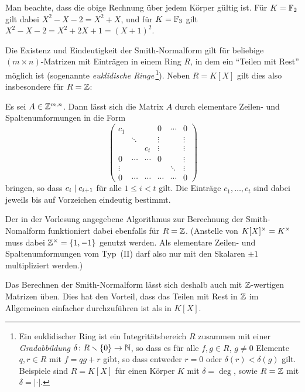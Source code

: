 Man beachte, dass die obige Rechnung über jedem Körper gültig ist.
Für $K = \mathbb{F}_2$ gilt dabei $X^2 - X - 2 = X^2 + X$, und für $K = \mathbb{F}_3$ gilt $X^2 - X - 2 = X^2 + 2X + 1 = (X+1)^2$.

\begin{remark}
  Die Existenz und Eindeutigkeit der Smith-Normalform gilt für beliebige $(m \times n)$-Matrizen mit Einträgen in einem Ring $R$, in dem ein \enquote{Teilen mit Rest} möglich ist (sogenannte \emph{euklidische Ringe}\,\footnote{
  Ein euklidischer Ring ist ein Integritätsbereich $R$ zusammen mit einer \emph{Gradabbildung} $\delta \colon R \smallsetminus \{0\} \to \mathbb{N}$, so dass es für alle $f, g \in R$, $g \neq 0$ Elemente $q , r \in R$ mit $f = qg + r$ gibt, so dass entweder $r = 0$ oder $\delta(r) < \delta(g)$ gilt.
  Beispiele sind $R = K[X]$ für einen Körper $K$ mit $\delta = \deg$, sowie $R = \mathbb{Z}$ mit $\delta = |\cdot|$.}).
  Neben $R = K[X]$ gilt dies also insbesondere für $R = \mathbb{Z}$:
  
  \begin{theorem}
    Es sei $A \in \mathbb{Z}^{m, n}$.
    Dann lässt sich die Matrix $A$ durch elementare Zeilen- und Spaltenumformungen in die Form
    \[
      \begin{pmatrix}
        c_1     &         &         & 0       & \cdots  & 0       \\
                & \ddots  &         & \vdots  &         & \vdots  \\
                &         & c_t     & \vdots  &         & \vdots  \\
        0       & \cdots  & \cdots  & 0       &         & \vdots  \\
        \vdots  &         &         &         & \ddots  & \vdots  \\
        0       & \cdots  & \cdots  & \cdots  & \cdots  & 0
      \end{pmatrix}
    \]
    bringen, so dass $c_i \mathrel{|} c_{i+1}$ für alle $1 \leq i < t$ gilt.
    Die Einträge $c_1, \dotsc, c_t$ sind dabei jeweils bis auf Vorzeichen eindeutig bestimmt.
  \end{theorem}
  
  Der in der Vorlesung angegebene Algorithmus zur Berechnung der Smith-Nomalform funktioniert dabei ebenfalls für $R = \mathbb{Z}$.
  (Anstelle von $K[X]^\times = K^\times$ muss dabei $\mathbb{Z}^\times = \{1, -1\}$ genutzt werden.
  Als elementare Zeilen- und Spaltenumformungen vom Typ~(II) darf also nur mit den Skalaren $\pm 1$ multipliziert werden.)
  
  Das Berechnen der Smith-Normalform lässt sich deshalb auch mit $\mathbb{Z}$-wertigen Matrizen üben.
  Dies hat den Vorteil, dass das Teilen mit Rest in $\mathbb{Z}$ im Allgemeinen einfacher durchzuführen ist als in $K[X]$.
\end{remark}

